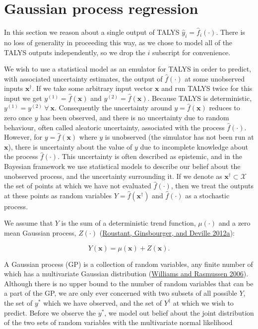 \documentclass[
  12pt,
  a4paper,
  twoside]{book}
\begin{document}
\hypertarget{GPR:GPR}{%
\section{Gaussian process regression}\label{GPR:GPR}}

In this section we reason about a single output of TALYS \(\hat{y}_i = \hat{f}_i(\cdot)\). There is no loss of generality in proceeding this way, as we chose to model all of the TALYS outputs independently, so we drop the \(i\) subscript for convenience.

We wish to use a statistical model as an emulator for TALYS in order to predict, with associated uncertainty estimates, the output of \(\hat{f}(\cdot)\) at some unobserved inputs \(\mathbf{x}^\dagger\). If we take some arbitrary input vector \(\mathbf{x}\) and run TALYS twice for this input we get \(y^{(1)} = \hat{f}(\mathbf{x})\) and \(y^{(2)} = \hat{f}(\mathbf{x})\). Because TALYS is deterministic, \(y^{(1)} = y^{(2)}~ \forall~ \mathbf{x}\). Consequently the uncertainty around \(y = \hat{f}(\mathbf{x})\) reduces to zero once \(y\) has been observed, and there is no uncertainty due to random behaviour, often called aleatoric uncertainty, associated with the process \(\hat{f}(\cdot)\). However, for \(y = \hat{f}(\mathbf{x})\) where \(y\) is unobserved (the simulator has not been run at \(\mathbf{x}\)), there is uncertainty about the value of \(y\) due to incomplete knowledge about the process \(\hat{f}(\cdot)\). This uncertainty is often described as epistemic, and in the Bayesian framework we use statistical models to describe our belief about the unobserved process, and the uncertainty surrounding it. If we denote as \(\mathbf{x^\dagger} \subset \mathcal{X}\) the set of points at which we have not evaluated \(\hat{f}(\cdot)\), then we treat the outputs at these points as random variables \(Y = \hat{f}(\mathbf{x^\dagger})\) and \(\hat{f}(\cdot)\) as a stochastic process.

We assume that \(Y\) is the sum of a deterministic trend function, \(\mu(\mathbf{\cdot})\) and a zero mean Gaussian process, \(Z(\mathbf{\cdot})\) (\protect\hyperlink{ref-dicekriging}{Roustant, Ginsbourger, and Deville 2012a}):

\begin{equation}
\label{eq:process}
Y(\mathbf{x}) = \mu(\mathbf{x}) + Z(\mathbf{x}).
\end{equation}

A Gaussian process (GP) is a collection of random variables, any finite number of which has a multivariate Gaussian distribution (\protect\hyperlink{ref-gp4ml}{Williams and Rasmussen 2006}). Although there is no upper bound to the number of random variables that can be a part of the GP, we are only ever concerned with two subsets of all possible \(Y\), the set of \(y^*\) which we have observed, and the set of \(Y^\dagger\) at which we wish to predict. Before we observe the \(y^*\), we model out belief about the joint distribution
of the two sets of random variables with the multivariate normal likelihood
\end{document}
